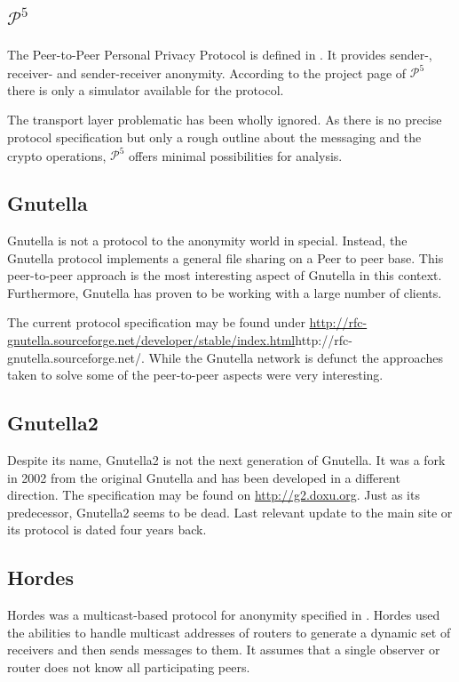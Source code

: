 \subsection{\texorpdfstring{$\mathcal{P}^5$}{P5}}
The Peer-to-Peer Personal Privacy Protocol is defined in \cite{sherwood-protocol}. It provides sender-, receiver- and sender-receiver anonymity. According to the project page of $\mathcal{P}^5$ there is only a simulator available for the protocol.

The transport layer problematic has been wholly ignored. As there is no precise protocol specification but only a rough outline about the messaging and the crypto operations, $\mathcal{P}^5$ offers minimal possibilities for analysis.

\subsection{Gnutella}
Gnutella is not a protocol to the anonymity world in special. Instead, the Gnutella protocol implements a general file sharing on a Peer to peer base. This peer-to-peer approach is the most interesting aspect of Gnutella in this context. Furthermore, Gnutella has proven to be working with a large number of clients.

The current protocol specification may be found under \url{http://rfc-gnutella.sourceforge.net/developer/stable/index.html}{http://rfc-gnutella.sourceforge.net/}. While the Gnutella network is defunct the approaches taken to solve some of the peer-to-peer aspects were very interesting.

\subsection{Gnutella2}
Despite its name, Gnutella2 is not the next generation of Gnutella. It was a fork in 2002 from the original Gnutella and has been developed in a different direction. The specification may be found on \url{http://g2.doxu.org}. Just as its predecessor, Gnutella2 seems to be dead. Last relevant update to the main site or its protocol is dated four years back.

\subsection{Hordes}
Hordes was a multicast-based protocol for anonymity specified in \cite{Levine:2002}. Hordes used the abilities to handle multicast addresses of routers to generate a dynamic set of receivers and then sends messages to them. It assumes that a single observer or router does not know all participating peers. 

